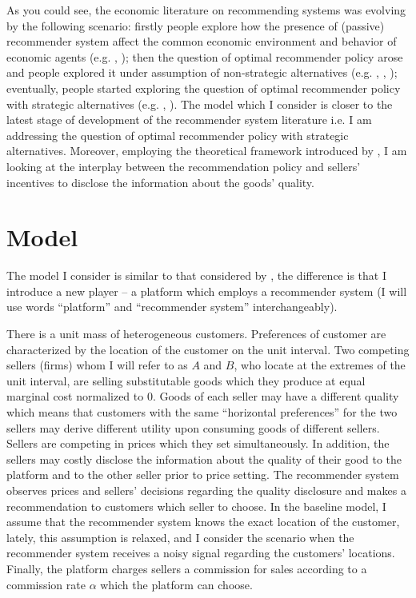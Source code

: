 \documentclass[a4paper]{article}
\begin{document}
As you could see, the economic literature on recommending systems was evolving by the following scenario: firstly people explore how the presence of (passive) recommender system affect the common economic environment and behavior of economic agents (e.g. \cite{avery1999market}, \cite{bergemann2006optimal}); then the question of optimal recommender policy arose and people explored it under assumption of non-strategic alternatives (e.g. \cite{kremer2014}, \cite{che2015}, \cite{papanastasiou2017}); eventually, people started exploring the question of optimal recommender policy with strategic alternatives (e.g. \cite{li2018recommender}, \cite{chen2016advertising}). The model which I consider is closer to the latest stage of development of the recommender system literature i.e. I am addressing the question of optimal recommender policy with strategic alternatives. Moreover, employing the theoretical framework introduced by \cite{levin2009quality}, I am looking at the interplay between the recommendation policy and sellers' incentives to disclose the information about the goods' quality.	
	\section{Model}
The model I consider is similar to that considered by \cite{levin2009quality}, the difference is that I introduce a new player -- a platform which employs a recommender system (I will use words ``platform'' and ``recommender system'' interchangeably).
		
	
There is a unit mass of heterogeneous customers. Preferences of customer are characterized by the location of the customer on the unit interval. Two competing sellers (firms) whom I will refer to as $A$ and $B$, who locate at the extremes of the unit interval, are selling substitutable goods which they produce at equal marginal cost normalized to 0. Goods of each seller may have a different quality which means that customers with the same ``horizontal preferences'' for the two sellers may derive different utility upon consuming goods of different sellers. Sellers are competing in prices which they set simultaneously. In addition, the sellers may costly disclose the information about the quality of their good to the platform and to the other seller prior to price setting. The recommender system observes prices and sellers' decisions regarding the quality disclosure and makes a recommendation to customers which seller to choose. In the baseline model, I assume that the recommender system knows the exact location of the customer, lately, this assumption is relaxed, and I consider the scenario when the recommender system receives a noisy signal regarding the customers' locations. Finally, the platform charges sellers a commission for sales according to a commission rate $\alpha$ which the platform can choose. 
	
\end{document}
